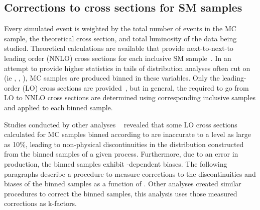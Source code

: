 \subsection{Corrections to cross sections for SM samples\label{sec:k-factors}}

Every simulated event is weighted by the total number of events in the MC sample, 
the theoretical cross section, and total luminosity of the data being studied.
Theoretical calculations are available that provide next-to-next-to 
leading order (NNLO) cross sections for each inclusive SM sample~\cite{twiki-xs}. In an attempt to 
provide higher statistics in tails of distribution analyses often cut on 
(ie \partonht, \nparton, \pthat), MC samples are produced binned in these
 variables. Only the leading-order (LO) cross sections are provided~\cite{prep}, 
but in general, the \kfactors required to go from LO to NNLO cross sections
are determined using corresponding inclusive samples and applied to each binned sample. 

Studies conducted by other analyses ~\cite{RobXS} revealed that some LO cross
sections calculated for MC samples binned according to \partonht are
inaccurate to a level as large as 10\%, leading to non-physical discontinuities 
in the \partonht distribution constructed from the binned samples of a given process.
Furthermore, due to an error in production, the \wlnu \; \scalht binned samples exhibit 
\scalht-dependent biases. The following paragraphs describe a procedure to measure 
corrections to the discontinuities and biases of the \wlnu \; \partonht binned samples 
as a function of \scalht. Other analyses created similar procedures to correct 
the \zmumu \; \partonht binned samples, this analysis uses those measured corrections 
as k-factors.  

